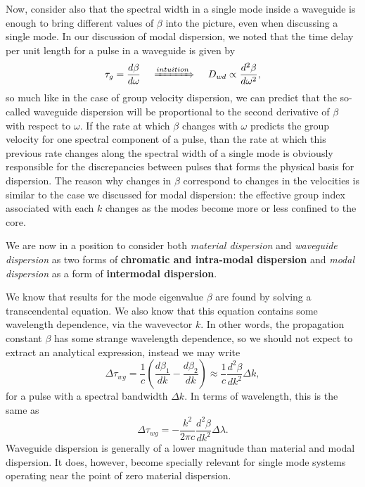 Now, consider also that the spectral width in a single mode inside a waveguide is enough to bring different values of $\beta$ into the picture, even when discussing a single mode. In our discussion of modal dispersion, we noted that the time delay per unit length for a pulse in a waveguide is given by
\begin{equation}
    \tau_g=\frac{d\beta}{d\omega}\;\;\;\;\xRightarrow{intuition}\;\;\;\;D_{wd}\propto\frac{d^2\beta}{d\omega^2},
\end{equation}
so much like in the case of group velocity dispersion, we can predict that the so-called waveguide dispersion will be proportional to the second derivative of $\beta$ with respect to $\omega$. If the rate at which $\beta$ changes with $\omega$ predicts the group velocity for one spectral component of a pulse, than the rate at which this previous rate changes along the spectral width of a single mode is obviously responsible for the discrepancies between pulses that forms the physical basis for dispersion. The reason why changes in $\beta$ correspond to changes in the velocities is similar to the case we discussed for modal dispersion: the effective group index associated with each $k$ changes as the modes become more or less confined to the core.

We are now in a position to consider both \textit{material dispersion} and \textit{waveguide dispersion} as two forms of \textbf{chromatic and intra-modal dispersion} and \textit{modal dispersion} as a form of \textbf{intermodal dispersion}.

We know that results for the mode eigenvalue $\beta$ are found by solving a transcendental equation. We also know that this equation contains some wavelength dependence, via the wavevector $k$. In other words, the propagation constant $\beta$ has some strange wavelength dependence, so we should not expect to extract an analytical expression, instead we may write
\begin{equation}
    \Delta\tau_{wg}=\frac{1}{c}\left(\frac{d\beta_1}{dk}-\frac{d\beta_2}{dk}\right)\approx\frac{1}{c}\frac{d^2\beta}{dk^2}\Delta k,
\end{equation}
for a pulse with a spectral bandwidth $\Delta k$. In terms of wavelength, this is the same as
\begin{equation}
    \Delta\tau_{wg}=-\frac{k^2}{2\pi c}\frac{d^2\beta}{dk^2}\Delta\lambda.
\end{equation}
Waveguide dispersion is generally of a lower magnitude than material and modal dispersion. It does, however, become specially relevant for single mode systems operating near the point of zero material dispersion.

